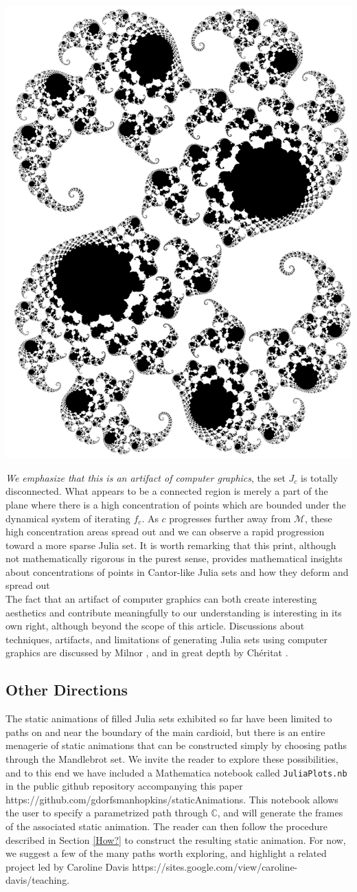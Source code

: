 \documentclass[12 pt]{article}
\newcommand{\bC}{\mathbb{C}}
\newcommand{\cM}{\mathcal{M}}
\begin{document}
\begin{center}
\includegraphics[width=.5\textwidth]{images/cantor_cropped.png}
\end{center}
\textit{We emphasize that this is an artifact of computer graphics}, the set $J_c$ is totally disconnected.  What appears to be a connected region is merely a part of the plane where there is a high concentration of points which are bounded under the dynamical system of iterating $f_c$.  As $c$ progresses further away from $\cM$, these high concentration areas spread out and we can observe a rapid progression toward a more sparse Julia set.  It is worth remarking that this print, although not mathematically rigorous in the purest sense, provides mathematical insights about concentrations of points in Cantor-like Julia sets and how they deform and spread out\\

The fact that an artifact of computer graphics can both create interesting aesthetics and contribute meaningfully to our understanding is interesting in its own right, although beyond the scope of this article.  Discussions about techniques, artifacts, and limitations of generating Julia sets using computer graphics are discussed by Milnor \cite[Appendix H]{Milnor}, and in great depth by Ch\'eritat \cite{Cheritat}.
\subsection{Other Directions}\label{juliaMore}
The static animations of filled Julia sets exhibited so far have been limited to paths on and near the boundary of the main cardioid,  but there is an entire menagerie of static animations that can be constructed simply by choosing paths through the Mandlebrot set.  We invite the reader to explore these possibilities, and to this end we have included a Mathematica notebook called \verb|JuliaPlots.nb| in the public github repository accompanying this paper https://github.com/gdorfsmanhopkins/staticAnimations.   This notebook allows the user to specify a parametrized path through $\bC$, and will generate the frames of the associated static animation.  The reader can then follow the procedure described in Section \ref{How?} to construct the resulting static animation. For now, we suggest a few of the many paths worth exploring, and highlight a related project led by Caroline Davis https://sites.google.com/view/caroline-davis/teaching.
\end{document}
